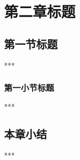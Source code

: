 \chapter{第二章标题}
\label{ch2:keymethods}

\section{第一节标题}
\label{ch2:sec1}
***
\subsection{第一小节标题}
***
\section{本章小结}
***